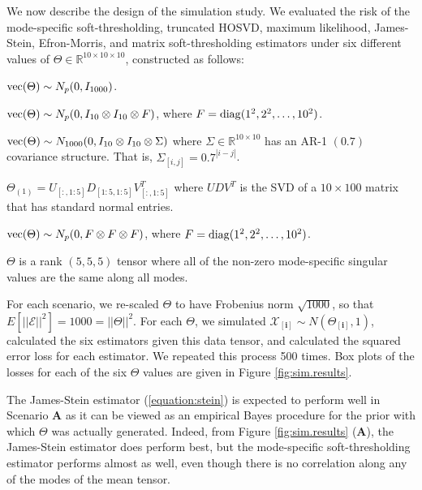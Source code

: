 We now describe the design of the simulation study. We evaluated the
risk of the mode-specific soft-thresholding, truncated HOSVD, maximum
likelihood, James-Stein, Efron-Morris, and matrix soft-thresholding
estimators under six different values of $\Theta \in \mathbb{R}^{10
  \times 10 \times 10}$, constructed as follows:
\begin{description}[noitemsep]
\item[A.] $\operatorname*{vec}(\Theta) \sim N_p(0,I_{1000})$.
\item[B.] $\operatorname*{vec}(\Theta) \sim N_p(0,I_{10} \otimes I_{10} \otimes F)$, where $F =
  \operatorname*{diag}(1^2,2^2,\ldots,10^2)$.
\item[C.] $\operatorname*{vec}(\Theta) \sim N_{1000}(0,I_{10}\otimes I_{10}\otimes \Sigma)$ where
  $\Sigma \in \mathbb{R}^{10\times 10}$ has an AR-1 $(0.7)$ covariance structure. That is,
  $\Sigma_{[i,j]} = 0.7^{|i - j|}$.
\item[D.] $\Theta_{(1)} = U_{[:,1:5]}D_{[1:5,1:5]}V_{[:,1:5]}^T$ where
  $UDV^T$ is the SVD of a $10 \times 100$ matrix that has standard
  normal entries.
\item[E.] $\operatorname*{vec}(\Theta) \sim N_p(0,F \otimes F \otimes F)$, where $F =
  \operatorname*{diag}(1^2,2^2,\ldots,10^2)$.
\item[F.] $\Theta$ is a rank $(5,5,5)$ tensor where all of the non-zero mode-specific
  singular values are the same along all modes.
\end{description}
For each scenario, we re-scaled $\Theta$ to have Frobenius norm
$\sqrt{1000}$, so that $E[||\mathcal{E}||^2] = 1000 =
||\Theta||^2$. For each $\Theta$, we simulated
$\mathcal{X}_{[\mathbf{i}]} \sim N(\Theta_{[\mathbf{i}]},1)$,
calculated the six estimators given this data tensor, and calculated
the squared error loss for each estimator. We repeated this process
500 times. Box plots of the losses for each of the six $\Theta$ values
are given in Figure \ref{fig:sim.results}.

The James-Stein estimator (\ref{equation:stein}) is expected to
perform well in Scenario \textbf{A} as it can be viewed as an
empirical Bayes procedure for the prior with which $\Theta$ was
actually generated.
Indeed, from Figure \ref{fig:sim.results} (\textbf{A}), the
James-Stein estimator does perform best, but the mode-specific
soft-thresholding estimator performs almost as well, even though there
is no correlation along any of the modes of the mean tensor.

